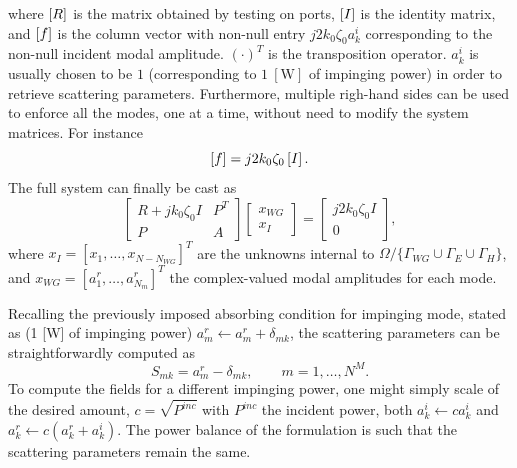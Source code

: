 \noindent where $\left[R\right]$ is the matrix obtained by testing on ports, $\left[I\right]$ is the identity matrix, and $\left[f\right]$ is the column vector with non-null entry $j2 k_0\zeta_0 a_k^i$ corresponding to the non-null incident modal amplitude. $(\cdot)^T$ is the transposition operator. $a_k^i$ is usually chosen to be $1$ (corresponding to $1~\mathrm{[W]}$ of impinging power) in order to retrieve scattering parameters. Furthermore, multiple righ-hand sides can be used to enforce all the modes, one at a time, without need to modify the system matrices. For instance
$$\left[f\right] = j2 k_0\zeta_0 \left[I\right].$$
\noindent The full system can finally be cast as
\begin{equation}
\label{eq:FEsys}
\begin{bmatrix}
R + jk_0\zeta_0 I & P^T\\
P & A
\end{bmatrix}
\begin{bmatrix}
x_{WG} \\
x_{I}
\end{bmatrix} =
\begin{bmatrix}
j2 k_0\zeta_0 I \\
0
\end{bmatrix},
\end{equation}
%
\noindent where $x_I = \left[ x_1, \ldots, x_{N-N_{WG}} \right]^T$ are the unknowns internal to $\Omega/\lbrace\Gamma_{WG}\cup\Gamma_{E}\cup\Gamma_{H} \rbrace$, and $x_{WG} = \left[ a_1^r, \ldots, a_{N_m}^r \right]^T$ the complex-valued modal amplitudes for each mode.

Recalling the previously imposed absorbing condition for impinging mode, stated as (1 [W] of impinging power) $a_m^r \leftarrow a_m^r + \delta_{mk}$, the scattering parameters can be straightforwardly computed as
$$S_{mk} = a_m^r - \delta_{mk}, \qquad m = 1, \ldots,  N^M.$$
\noindent To compute the fields for a different impinging power, one might simply scale of the desired amount, $c = \sqrt{P^{inc}}$ with $P^{inc}$ the incident power, both $a_k^i \leftarrow c a_k^i$ and $a_k^r \leftarrow c (a_k^r+a_k^i)$. The power balance of the formulation is such that the scattering parameters remain the same.

